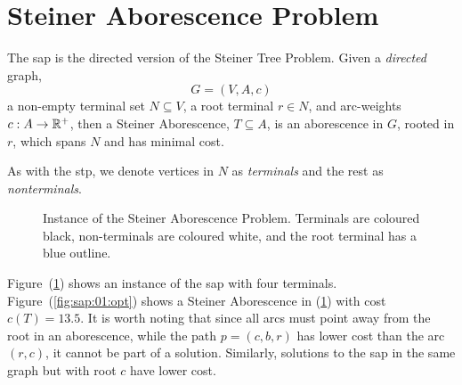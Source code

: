 \section{Steiner Aborescence Problem}
The \gls{sap} is the directed version of the Steiner Tree Problem.
Given a \textit{directed} graph,
\[G = (V, A, c)\]
a non-empty terminal set $N \subseteq V$, a root terminal $r \in N$, and arc-weights $c : A \to \mathbb{R}^+$,
then a Steiner Aborescence, $T \subseteq A$, is an aborescence
in $G$, rooted in $r$, which spans $N$ and has minimal cost.

As with the \gls{stp}, we denote vertices in $N$ as \textit{terminals} and the rest as \textit{nonterminals}.
\begin{figure}[h]\centering
{}
\caption{Instance of the Steiner Aborescence Problem. Terminals are coloured black, non-terminals are coloured white, and the root terminal
  has a blue outline.}
\label{fig:sap:01}
\end{figure}

Figure~(\ref{fig:sap:01}) shows an instance of the \gls{sap} with four terminals. Figure~(\ref{fig:sap:01:opt}) shows a Steiner Aborescence in (\ref{fig:sap:01})
with cost $c(T) = 13.5$. It is worth noting that since all arcs must point away from the root in an aborescence, while the path $p = (c, b, r)$  has
 lower cost than the arc $(r, c)$, it cannot be part of a solution. Similarly, solutions to the \gls{sap} in the same graph but with root $c$ have lower cost.

